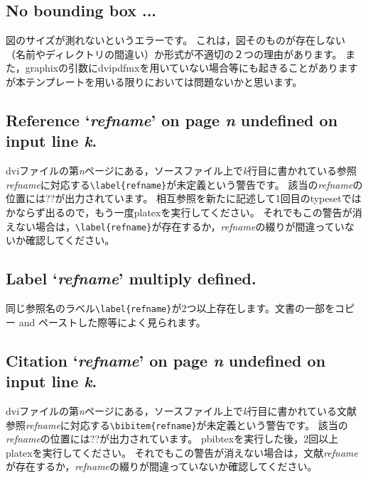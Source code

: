 \documentclass[10pt,a4paper,oneside,twocolumn,fleqn,dvipdfmx]{jsarticle}
\begin{document}
\subsection{No bounding box ...}
図のサイズが測れないというエラーです。
これは，図そのものが存在しない（名前やディレクトリの間違い）か形式が不適切の２つの理由があります。
また，graphixの引数にdvipdfmxを用いていない場合等にも起きることがありますが本テンプレートを用いる限りにおいては問題ないかと思います。

\subsection{Reference `\textit{refname}' on page \textit{n} undefined on input line \textit{k}.}
dviファイルの第\textit{n}ページにある，ソースファイル上で\textit{k}行目に書かれている参照\textit{refname}に対応する\verb|\label{refname}|が未定義という警告です。
該当の\textit{refname}の位置には??が出力されています。
相互参照を新たに記述して1回目のtypesetではかならず出るので，もう一度platexを実行してください。
それでもこの警告が消えない場合は，\verb|\label{refname}|が存在するか，\textit{refname}の綴りが間違っていないか確認してください。

\subsection{Label `\textit{refname}' multiply defined.}
同じ参照名のラベル\verb|\label{refname}|が2つ以上存在します。文書の一部をコピー and ペーストした際等によく見られます。

\subsection{Citation `\textit{refname}' on page \textit{n} undefined on input line \textit{k}.}
dviファイルの第\textit{n}ページにある，ソースファイル上で\textit{k}行目に書かれている文献参照\textit{refname}に対応する\verb|\bibitem{refname}|が未定義という警告です。
該当の\textit{refname}の位置には??が出力されています。
pbibtexを実行した後，2回以上platexを実行してください。
それでもこの警告が消えない場合は，文献\textit{refname}が存在するか，\textit{refname}の綴りが間違っていないか確認してください。
\end{document}
